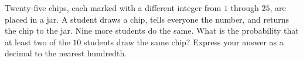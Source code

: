 Twenty-five chips, each marked with a different integer from $1$ through $25$, are placed in a jar. A student draws a chip, tells everyone the number, and returns the chip to the jar. Nine more students do the same. What is the probability that at least two of the $10$ students draw the same chip? Express your answer as a decimal to the nearest hundredth.
